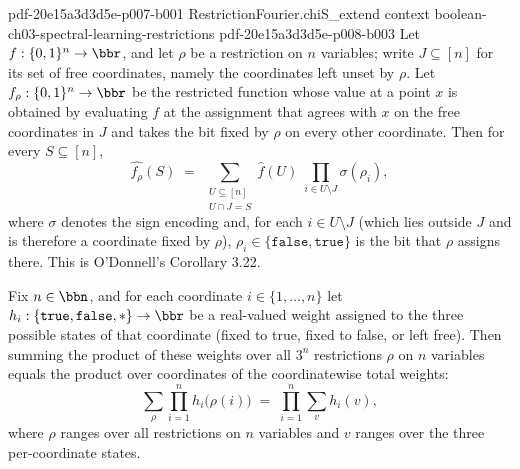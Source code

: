\begin{theorem}
  {pdf-20e15a3d3d5e-p007-b001}
\proofstep
  {RestrictionFourier.chiS_extend}
  {context}
  {boolean-ch03-spectral-learning-restrictions}
  {pdf-20e15a3d3d5e-p008-b003}
Let $f : \{0,1\}^n \to \bbr$, and let $\rho$ be a restriction on $n$ variables; write $J
\subseteq [n]$ for its set of free coordinates, namely the coordinates left unset by
$\rho$. Let $f_\rho : \{0,1\}^n \to \bbr$ be the restricted function whose value at a
point $x$ is obtained by evaluating $f$ at the assignment that agrees with $x$ on the
free coordinates in $J$ and takes the bit fixed by $\rho$ on every other coordinate.
Then for every $S \subseteq [n]$,
\[
\widehat{f_\rho}(S) \;=\; \sum_{\substack{U \subseteq [n] \\ U \cap J = S}}
\widehat{f}(U)\;\prod_{i \in U \setminus J} \sigma(\rho_i),
\]
where $\sigma$ denotes the sign encoding and, for each $i \in U \setminus J$ (which lies
outside $J$ and is therefore a coordinate fixed by $\rho$), $\rho_i \in
\{\mathtt{false},\mathtt{true}\}$ is the bit that $\rho$ assigns there. This is
O'Donnell's Corollary 3.22.
\end{theorem}

\begin{lemma}
\label{RestrictionFourier.sum_restriction_prod}
\leanok
{}
Fix $n \in \bbn$, and for each coordinate $i \in \{1,\dots,n\}$ let $h_i :
\{\mathtt{true},\mathtt{false},\ast\} \to \bbr$ be a real-valued weight assigned to the
three possible states of that coordinate (fixed to true, fixed to false, or left free).
Then summing the product of these weights over all $3^n$ restrictions $\rho$ on $n$
variables equals the product over coordinates of the coordinatewise total weights:
\[
\sum_{\rho} \prod_{i=1}^{n} h_i\bigl(\rho(i)\bigr) \;=\; \prod_{i=1}^{n} \sum_{v}
h_i(v),
\]
where $\rho$ ranges over all restrictions on $n$ variables and $v$ ranges over the three
per-coordinate states.
\end{lemma}

